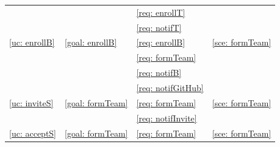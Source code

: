 \begin{table}[h]
\begin{tabular}{|m{3cm}|m{3cm}|m{3cm}|m{3cm}|}
                \null & \null  & \ref{req: enrollT}&\null \\
                \null & \null  & \ref{req: notifT}&\null \\
                \hline
                \ref{uc: enrollB} & \ref{goal: enrollB} & \ref{req: enrollB} & \ref{sce: formTeam} \\
                \null & \null  & \ref{req: formTeam}& \null \\ 
                \null & \null  & \ref{req: notifB}&\null \\
                \null & \null  & \ref{req: notifGitHub}&\null \\
                \hline
                \ref{uc: inviteS} & \ref{goal: formTeam} & \ref{req: formTeam} & \ref{sce: formTeam} \\
                \null & \null  & \ref{req: notifInvite}& \null \\ 
                \hline
                \ref{uc: acceptS} & \ref{goal: formTeam} & \ref{req: formTeam} & \ref{sce: formTeam}  \\
                \hline
            \end{tabular}
    \end{table}

